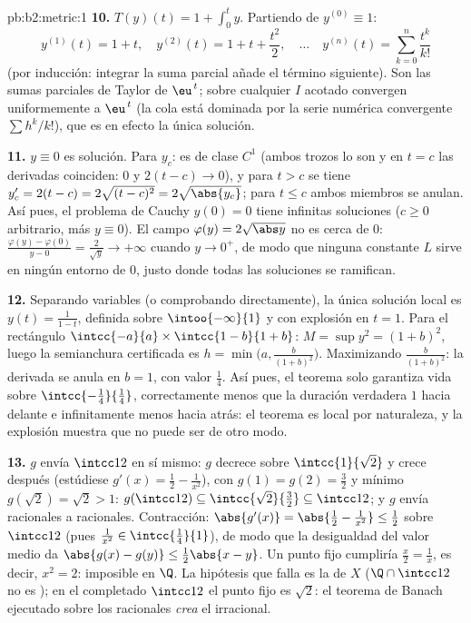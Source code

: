 \begin{solution}{pb:b2:metric:1}
\textbf{10.} $T(y)(t) = 1 + \int_0^t y$. Partiendo de $y^{(0)}
\equiv 1$:
\[
y^{(1)}(t) = 1 + t,\quad
y^{(2)}(t) = 1 + t + \frac{t^2}2,\quad\dots\quad
y^{(n)}(t) = \sum_{k=0}^{n}\frac{t^k}{k!}
\]
(por inducción: integrar la suma parcial añade el término
siguiente). Son las sumas parciales de Taylor de $\eu^{\,t}$;
sobre cualquier $I$ acotado convergen uniformemente a $\eu^{\,t}$
(la cola está dominada por la serie numérica convergente $\sum
h^k/k!$), que es en efecto la única solución.

\textbf{11.} $y \equiv 0$ es solución. Para $y_c$: es de clase
$C^1$ (ambos trozos lo son y en $t = c$ las derivadas coinciden:
$0$ y $2(t - c) \to 0$), y para $t > c$ se tiene $y_c' = 2(t - c)
= 2\sqrt{(t-c)^2} = 2\sqrt{\abs{y_c}}$; para $t \leq c$ ambos
miembros se anulan. Así pues, el problema de Cauchy $y(0) = 0$
tiene infinitas soluciones ($c \geq 0$ arbitrario, más $y \equiv
0$). El campo $\varphi(y) = 2\sqrt{\abs y}$ no es 
cerca de $0$: $\frac{\varphi(y) - \varphi(0)}{y - 0} =
\frac{2}{\sqrt y} \to +\infty$ cuando $y \to 0^+$, de modo que
ninguna constante $L$ sirve en ningún entorno de $0$, justo donde
todas las soluciones se ramifican.

\textbf{12.} Separando variables (o comprobando directamente), la
única solución local es $y(t) = \frac1{1 - t}$, definida sobre
$\intoo{-\infty}{1}$ y con explosión en $t = 1$. Para el
rectángulo $\intcc{-a}{a} \times \intcc{1 - b}{1 + b}$: $M = \sup
y^2 = (1 + b)^2$, luego la semianchura certificada es $h =
\min\bigl(a, \frac{b}{(1+b)^2}\bigr)$. Maximizando
$\frac{b}{(1+b)^2}$: la derivada se anula en $b = 1$, con valor
$\frac14$. Así pues, el teorema solo garantiza vida sobre
$\intcc{-\frac14}{\frac14}$, correctamente menos que la duración
verdadera $1$ hacia delante e infinitamente menos hacia atrás: el
teorema es local por naturaleza, y la explosión muestra que no
puede ser de otro modo.

\textbf{13.} $g$ envía $\intcc12$ en sí mismo: $g$ decrece sobre
$\intcc{1}{\sqrt2}$ y crece después (estúdiese $g'(x) = \frac12 -
\frac1{x^2}$), con $g(1) = g(2) = \frac32$ y mínimo $g(\sqrt2) =
\sqrt2 > 1$: $g(\intcc12) \subseteq \intcc{\sqrt2}{\frac32}
\subseteq \intcc12$; y $g$ envía racionales a racionales.
Contracción: $\abs{g'(x)} = \abs{\frac12 - \frac1{x^2}} \leq
\frac12$ sobre $\intcc12$ (pues $\frac1{x^2} \in
\intcc{\frac14}{1}$), de modo que la desigualdad del valor medio
da $\abs{g(x) - g(y)} \leq \frac12\abs{x - y}$. Un punto fijo
cumpliría $\frac x2 = \frac1x$, es decir, $x^2 = 2$: imposible en
$\Q$. La hipótesis que falla es la  de $X$ ($\Q \cap
\intcc12$ no es ); en el completado $\intcc12$ el punto
fijo es $\sqrt2$: el teorema de Banach ejecutado sobre los
racionales \emph{crea} el irracional.


\end{solution}

